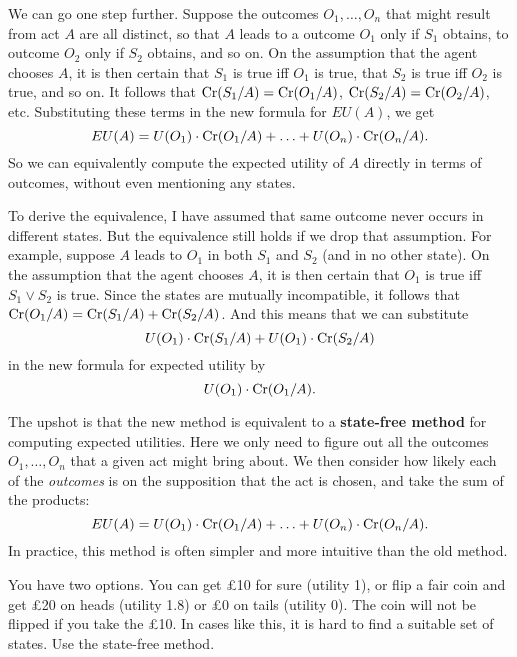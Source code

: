 
We can go one step further. Suppose the outcomes $O_1,\ldots,O_n$ that
might result from act $A$ are all distinct, so that $A$ leads to a
outcome $O_1$ only if $S_1$ obtains, to outcome $O_2$ only if $S_2$
obtains, and so on. On the assumption that the agent chooses $A$, it
is then certain that $S_1$ is true iff $O_1$ is true, that $S_2$ is
true iff $O_2$ is true, and so on. It follows that
$\text{Cr}(S_1/A) = \text{Cr}(O_1/A)$, $\text{Cr}(S_2/A) = \text{Cr}(O_2/A)$, etc.
Substituting these terms in the new formula for $EU(A)$, we get
\[
EU(A) = U(O_1) \cdot \text{Cr}(O_1/A) + \ldots + U(O_n) \cdot \text{Cr}(O_n/A).
\]
So we can equivalently compute the expected utility of $A$ directly in
terms of outcomes, without even mentioning any states.

To derive the equivalence, I have assumed that same outcome never
occurs in different states. But the equivalence still holds if we drop
that assumption. For example, suppose $A$ leads to $O_1$ in both $S_1$
and $S_2$ (and in no other state). On the assumption that the agent
chooses $A$, it is then certain that $O_1$ is true iff $S_1\lor S_2$
is true. Since the states are mutually incompatible, it follows that
$\text{Cr}(O_1/A) = \text{Cr}(S_1/A)+\text{Cr}(S_2/A)$. And this means that we can
substitute
\[
  U(O_1)\cdot \text{Cr}(S_1/A) + U(O_1)\cdot \text{Cr}(S_2/A)
\]
in the new formula for expected utility by
\[
  U(O_1)\cdot \text{Cr}(O_1/A).
\]


The upshot is that the new method is equivalent to a
\textbf{state-free method} for computing expected utilities. Here we
only need to figure out all the outcomes $O_1,\ldots, O_n$ that a
given act might bring about. We then consider how likely each of the
\emph{outcomes} is on the supposition that the act is chosen, and take
the sum of the products:
%
\[
EU(A) = U(O_1) \cdot \text{Cr}(O_1/A) + \ldots + U(O_n) \cdot \text{Cr}(O_n/A).
\]
In practice, this method is often simpler and more intuitive than
the old method.

\begin{exercise1}
  You have two options. You can get £10 for sure (utility 1), or flip
  a fair coin and get £20 on heads (utility 1.8) or £0 on tails
  (utility 0). The coin will not be flipped if you take the £10.  In
  cases like this, it is hard to find a suitable set of states. Use
  the state-free method.
\end{exercise1}

